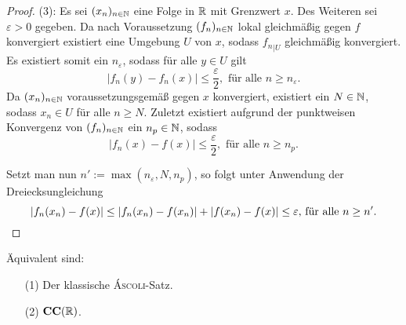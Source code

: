 \begin{proof}
  (3): 
  Es sei $(x_n)_{n \in \mathbb{N}}$ eine Folge in $\mathbb{R}$ mit Grenzwert $x$.
  Des Weiteren sei $\varepsilon > 0$ gegeben.
  Da nach Voraussetzung $(f_n)_{n \in \mathbb{N}}$ lokal gleichmäßig gegen $f$ konvergiert existiert eine Umgebung $U$ von $x$, sodass ${f_n}_{|U}$ gleichmäßig konvergiert.
  Es existiert somit ein $n_\varepsilon$, sodass für alle $y \in U$ gilt 
  \begin{displaymath}
    | f_n(y) - f_n(x) | \leq \frac{\varepsilon}{2}, \text{ für alle $n \geq n_\varepsilon$}.
  \end{displaymath}
  Da $(x_n)_{n \in \mathbb{N}}$ voraussetzungsgemäß gegen $x$ konvergiert, existiert ein $N \in \mathbb{N}$, sodass $x_n \in U$ für alle $n \geq N$.
  Zuletzt existiert aufgrund der punktweisen Konvergenz von $(f_n)_{n \in \mathbb{N}}$ ein $n_p \in \mathbb{N}$, sodass
  \begin{displaymath}
    | f_n(x) - f(x) | \leq \frac{\varepsilon}{2}, \text{ für alle $n \geq n_p$}.
  \end{displaymath}

  Setzt man nun $n':= \max(n_\varepsilon, N, n_p)$, so folgt unter Anwendung der Dreiecksungleichung
  \begin{displaymath}
    | f_n(x_n) - f(x) |
    \leq
    | f_n(x_n) - f(x_n) | + | f(x_n) - f(x) | 
    \leq \varepsilon \text{, für alle $n \geq n'$}. \qedhere
  \end{displaymath}

\end{proof}

\begin{thm}
  Äquivalent sind:
  \begin{enumerate}
    \item[(1)] Der klassische \textsc{Áscoli}-Satz.
    \item[(2)] $\mathbf{CC}(\mathbb{R})$.
  \end{enumerate}
\end{thm}

